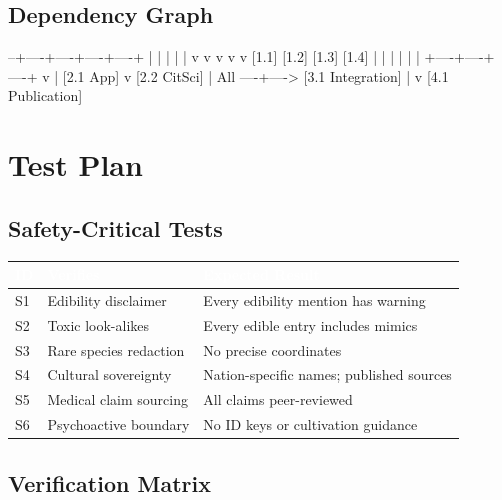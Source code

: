 \documentclass[11pt,letterpaper]{article}
\newcommand{\tableheader}[1]{\textbf{\sffamily\textcolor{white}{#1}}}
\begin{document}
\subsection{Dependency Graph}

\begin{asciibox}
[0.1 Schema] --+----+----+----+----+
               |    |    |    |    |
               v    v    v    v    v
           [1.1] [1.2] [1.3] [1.4] |
               |    |    |    |    |
               +----+----+----+    v
               |              [2.1 App]
               v
           [2.2 CitSci]
               |
       All ----+----> [3.1 Integration]
                           |
                           v
                     [4.1 Publication]
\end{asciibox}

\section{Test Plan}

\subsection{Safety-Critical Tests}

\begin{center}
\begin{tabularx}{\textwidth}{C{0.8cm}L{3cm}X}
\toprule
{}
\tableheader{ID} & \tableheader{Verifies} & \tableheader{Expected Result} \\
\midrule
S1 & Edibility disclaimer & Every edibility mention has warning \\
S2 & Toxic look-alikes & Every edible entry includes mimics \\
S3 & Rare species redaction & No precise coordinates \\
S4 & Cultural sovereignty & Nation-specific names; published sources \\
S5 & Medical claim sourcing & All claims peer-reviewed \\
S6 & Psychoactive boundary & No ID keys or cultivation guidance \\
\bottomrule
\end{tabularx}
\end{center}

\subsection{Verification Matrix}
\end{document}
